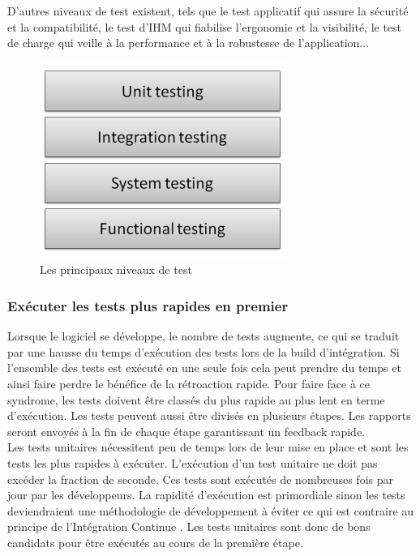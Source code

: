        D’autres niveaux de test existent, tels que le test applicatif qui assure la sécurité et la compatibilité, le test d’IHM qui fiabilise l’ergonomie et la visibilité, le test de charge qui veille à la performance et à la robustesse de l’application...

       \begin{figure}
         \begin{center}
           \includegraphics[scale=0.7]{images/testingLevels.png}
         \end{center}
         \caption{Les principaux niveaux de test}
         \label{Testing levels}
       \end{figure}

      \subsubsection{Exécuter les tests plus rapides en premier}
      Lorsque le logiciel se développe, le nombre de tests augmente, ce qui se traduit par une hausse du temps d’exécution des tests lors de la build d’intégration. Si l’ensemble des tests est exécuté en une seule fois cela peut prendre du temps et ainsi faire perdre le bénéfice de la rétroaction rapide. Pour faire face à ce syndrome, les tests doivent être classés du plus rapide au plus lent en terme d’exécution. Les tests peuvent aussi être divisés en plusieurs étapes. Les rapports seront envoyés à la fin de chaque étape garantissant un feedback rapide.\\

      Les tests unitaires nécessitent peu de temps lors de leur mise en place et sont les tests les plus rapides à exécuter. L’exécution d’un test unitaire ne doit pas excéder la fraction de seconde. Ces tests sont exécutés de nombreuses fois par jour par les développeurs. La rapidité d’exécution est primordiale sinon les tests deviendraient une méthodologie de développement à éviter ce qui est contraire au principe de l’Intégration Continue \cite{Duv07}. Les tests unitaires sont donc de bons candidats pour être exécutés au cours de la première étape.\\

